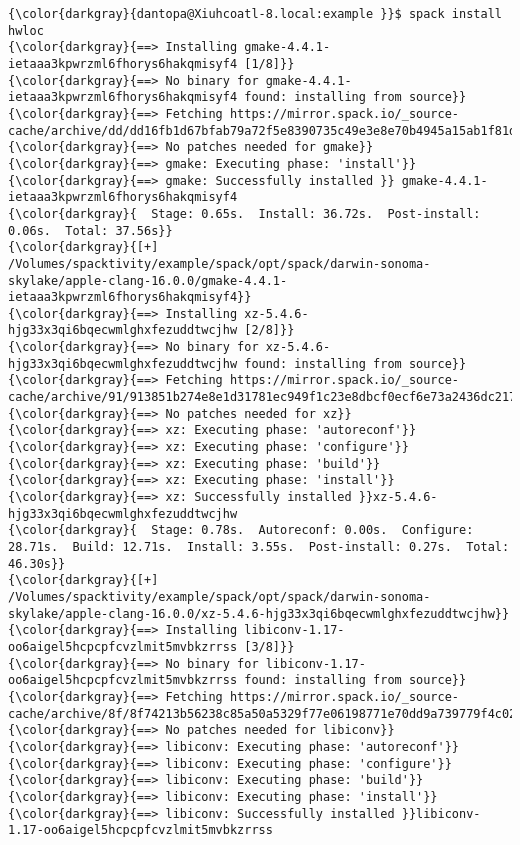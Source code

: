 \documentclass[10pt, oneside]{article}   	%
\begin{document}
{{\begin{Verbatim}[commandchars=\\\{\}]
{\color{darkgray}{dantopa@Xiuhcoatl-8.local:example }}$ spack install hwloc
{\color{darkgray}{==> Installing gmake-4.4.1-ietaaa3kpwrzml6fhorys6hakqmisyf4 [1/8]}}
{\color{darkgray}{==> No binary for gmake-4.4.1-ietaaa3kpwrzml6fhorys6hakqmisyf4 found: installing from source}}
{\color{darkgray}{==> Fetching https://mirror.spack.io/_source-cache/archive/dd/dd16fb1d67bfab79a72f5e8390735c49e3e8e70b4945a15ab1f81ddb78658fb3.tar.gz}}
{\color{darkgray}{==> No patches needed for gmake}}
{\color{darkgray}{==> gmake: Executing phase: 'install'}}
{\color{darkgray}{==> gmake: Successfully installed }} gmake-4.4.1-ietaaa3kpwrzml6fhorys6hakqmisyf4
{\color{darkgray}{  Stage: 0.65s.  Install: 36.72s.  Post-install: 0.06s.  Total: 37.56s}}
{\color{darkgray}{[+] /Volumes/spacktivity/example/spack/opt/spack/darwin-sonoma-skylake/apple-clang-16.0.0/gmake-4.4.1-ietaaa3kpwrzml6fhorys6hakqmisyf4}}
{\color{darkgray}{==> Installing xz-5.4.6-hjg33x3qi6bqecwmlghxfezuddtwcjhw [2/8]}}
{\color{darkgray}{==> No binary for xz-5.4.6-hjg33x3qi6bqecwmlghxfezuddtwcjhw found: installing from source}}
{\color{darkgray}{==> Fetching https://mirror.spack.io/_source-cache/archive/91/913851b274e8e1d31781ec949f1c23e8dbcf0ecf6e73a2436dc21769dd3e6f49.tar.bz2}}
{\color{darkgray}{==> No patches needed for xz}}
{\color{darkgray}{==> xz: Executing phase: 'autoreconf'}}
{\color{darkgray}{==> xz: Executing phase: 'configure'}}
{\color{darkgray}{==> xz: Executing phase: 'build'}}
{\color{darkgray}{==> xz: Executing phase: 'install'}}
{\color{darkgray}{==> xz: Successfully installed }}xz-5.4.6-hjg33x3qi6bqecwmlghxfezuddtwcjhw
{\color{darkgray}{  Stage: 0.78s.  Autoreconf: 0.00s.  Configure: 28.71s.  Build: 12.71s.  Install: 3.55s.  Post-install: 0.27s.  Total: 46.30s}}
{\color{darkgray}{[+] /Volumes/spacktivity/example/spack/opt/spack/darwin-sonoma-skylake/apple-clang-16.0.0/xz-5.4.6-hjg33x3qi6bqecwmlghxfezuddtwcjhw}}
{\color{darkgray}{==> Installing libiconv-1.17-oo6aigel5hcpcpfcvzlmit5mvbkzrrss [3/8]}}
{\color{darkgray}{==> No binary for libiconv-1.17-oo6aigel5hcpcpfcvzlmit5mvbkzrrss found: installing from source}}
{\color{darkgray}{==> Fetching https://mirror.spack.io/_source-cache/archive/8f/8f74213b56238c85a50a5329f77e06198771e70dd9a739779f4c02f65d971313.tar.gz}}
{\color{darkgray}{==> No patches needed for libiconv}}
{\color{darkgray}{==> libiconv: Executing phase: 'autoreconf'}}
{\color{darkgray}{==> libiconv: Executing phase: 'configure'}}
{\color{darkgray}{==> libiconv: Executing phase: 'build'}}
{\color{darkgray}{==> libiconv: Executing phase: 'install'}}
{\color{darkgray}{==> libiconv: Successfully installed }}libiconv-1.17-oo6aigel5hcpcpfcvzlmit5mvbkzrrss

\end{Verbatim}}}
\end{document}
